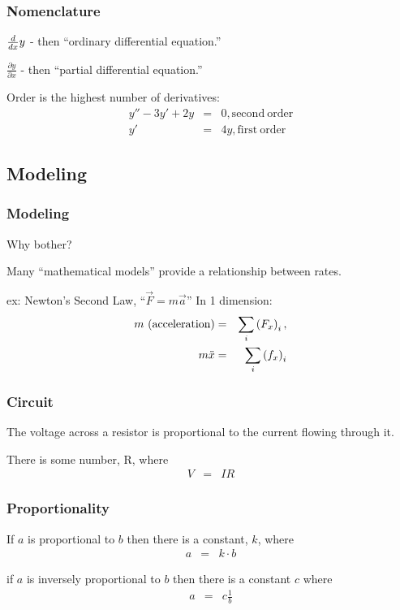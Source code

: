 \begin{frame}
  \frametitle{Nomenclature}
  
  \vfill

  $\deriv{y}{x}$ - then ``ordinary differential equation.''

  \vfill

  $\frac{\partial y}{\partial x}$ - then ``partial differential
  equation.''

  \vfill

  Order is the highest number of derivatives:
  \begin{eqnarray*}
    y'' - 3 y' + 2y & = & 0, \mathrm{second~order} \\
    y'  & = & 4y, \mathrm{first~order} 
  \end{eqnarray*}

  \vfill


\end{frame}

\subsection{Modeling}


\begin{frame}
  \frametitle{Modeling}

  Why bother?

  Many ``mathematical models'' provide a relationship between rates.

  ex: Newton's Second Law, ``$\vec{F} = m \vec{a}$'' In 1 dimension:
  \begin{eqnarray*}
    m\mathrm{~(acceleration)} & = & \sum_i \lp F_x \rp_i, \\
    m \ddot{x} & = & \sum_i \lp f_x \rp_i
  \end{eqnarray*}

  
\end{frame}


\begin{frame}
  \frametitle{Circuit}
  
  The voltage across a resistor is proportional to the current flowing
  through it.

  There is some number, R, where
  \begin{eqnarray*}
    V & = & IR
  \end{eqnarray*}
\end{frame}

\begin{frame}
  \frametitle{Proportionality}
  
  If $a$ is proportional to $b$ then there is a constant, $k$, where 
  \begin{eqnarray*}
    a  & = & k \cdot b
  \end{eqnarray*}

  if $a$ is inversely proportional to $b$ then there is a constant $c$
  where 
  \begin{eqnarray*}
    a & = & c \frac{1}{b}
  \end{eqnarray*}
\end{frame}


